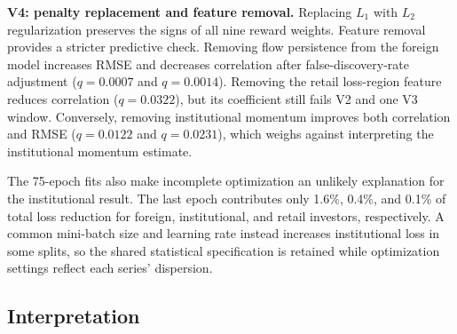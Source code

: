 \documentclass[sigconf,anonymous,review]{acmart}
\begin{document}
\textbf{V4: penalty replacement and feature removal.} Replacing $L_1$ with $L_2$
regularization preserves the signs of all nine reward weights. Feature removal
provides a stricter predictive check. Removing flow persistence from the foreign
model increases RMSE and decreases correlation after false-discovery-rate
adjustment ($q = 0.0007$ and $q = 0.0014$). Removing the retail loss-region
feature reduces correlation ($q = 0.0322$), but its coefficient still fails V2
and one V3 window. Conversely, removing institutional momentum improves both
correlation and RMSE ($q = 0.0122$ and $q = 0.0231$), which weighs against
interpreting the institutional momentum estimate.

The 75-epoch fits also make incomplete optimization an unlikely explanation for
the institutional result. The last epoch contributes only 1.6\%, 0.4\%, and
0.1\% of total loss reduction for foreign, institutional, and retail investors,
respectively. A common mini-batch size and learning rate instead increases
institutional loss in some splits, so the shared statistical specification is
retained while optimization settings reflect each series' dispersion.

\subsection{Interpretation}
\label{sec:exp-interp}
\end{document}
